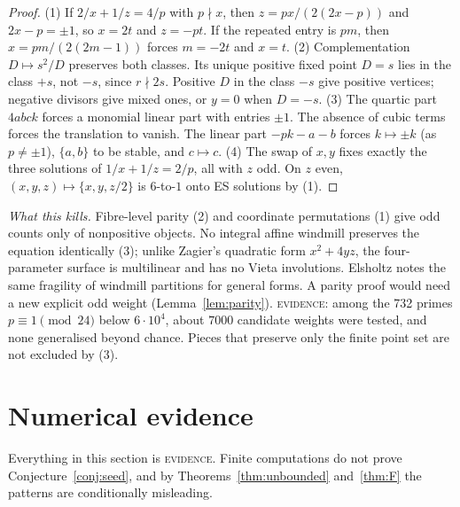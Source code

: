 \documentclass[11pt,reqno]{amsart}
\theoremstyle{definition}
\newcommand{\status}[1]{\textsc{#1}}
\begin{document}
\begin{proof}
(1) If $2/x+1/z=4/p$ with $p\nmid x$, then $z=px/(2(2x-p))$ and
$2x-p=\pm1$, so $x=2t$ and $z=-pt$.  If the repeated entry is $pm$, then
$x=pm/(2(2m-1))$ forces $m=-2t$ and $x=t$.  (2) Complementation
$D\mapsto s^2/D$ preserves both classes.  Its unique positive fixed point
$D=s$ lies in the class $+s$, not $-s$, since $r\nmid2s$.  Positive $D$ in
the class $-s$ give positive vertices; negative divisors give mixed ones,
or $y=0$ when $D=-s$.  (3) The quartic part $4abck$ forces a monomial
linear part with entries $\pm1$.  The absence of cubic terms forces the
translation to vanish.  The linear part $-pk-a-b$ forces $k\mapsto\pm k$
(as $p\ne\pm1$), $\{a,b\}$ to be stable, and $c\mapsto c$.  (4) The swap of
$x,y$ fixes exactly the three solutions of $1/x+1/z=2/p$, all with $z$ odd.
On $z$ even, $(x,y,z)\mapsto\{x,y,z/2\}$ is $6$-to-$1$ onto ES solutions by
(1).
\end{proof}

\emph{What this kills.}  Fibre-level parity (2) and coordinate
permutations (1) give odd counts only of nonpositive objects.  No integral
affine windmill preserves the equation identically (3); unlike Zagier's
quadratic form $x^2+4yz$, the four-parameter surface is multilinear and has
no Vieta involutions.  Elsholtz \cite[\S3]{Elsholtz} notes the same
fragility of windmill partitions for general forms.  A parity proof would need a new
explicit odd weight (Lemma~\ref{lem:parity}).
\status{evidence}: among the 732 primes $p\equiv1\pmod{24}$ below
$6\cdot10^4$, about $7000$ candidate weights were tested, and none
generalised beyond chance.  Pieces that preserve only the finite point set
are not excluded by (3).

\section{Numerical evidence}\label{sec:evidence}

Everything in this section is \status{evidence}.  Finite computations do
not prove Conjecture~\ref{conj:seed}, and by Theorems~\ref{thm:unbounded}
and~\ref{thm:F} the patterns are conditionally misleading.
\end{document}
